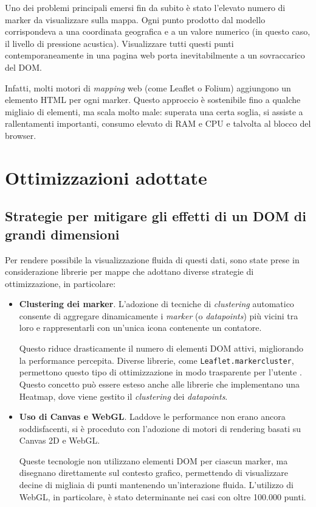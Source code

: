 Uno dei problemi principali emersi fin da subito è stato l'elevato numero di marker da visualizzare sulla mappa. Ogni punto prodotto dal modello corrispondeva a una coordinata geografica e a un valore numerico (in questo caso, il livello di pressione acustica). Visualizzare tutti questi punti contemporaneamente in una pagina web porta inevitabilmente a un sovraccarico del DOM.

Infatti, molti motori di \textit{mapping} web (come Leaflet o Folium) aggiungono un elemento HTML per ogni marker. Questo approccio è sostenibile fino a qualche migliaio di elementi, ma scala molto male: superata una certa soglia, si assiste a rallentamenti importanti, consumo elevato di RAM e CPU e talvolta al blocco del browser. \cite{folium-react}


\section{Ottimizzazioni adottate}

\subsection{Strategie per mitigare gli effetti di un DOM di grandi dimensioni}

Per rendere possibile la visualizzazione fluida di questi dati, sono state prese in considerazione librerie per mappe che adottano diverse strategie di ottimizzazione, in particolare:

\begin{itemize}
  \item \textbf{Clustering dei marker}. L'adozione di tecniche di \textit{clustering} automatico consente di aggregare dinamicamente i \textit{marker} (o \textit{datapoints}) più vicini tra loro e rappresentarli con un'unica icona contenente un contatore. 
  
  Questo riduce drasticamente il numero di elementi DOM attivi, migliorando la performance percepita. Diverse librerie, come \texttt{Leaflet.markercluster}, permettono questo tipo di ottimizzazione in modo trasparente per l'utente \cite{leaflet-clustering}. Questo concetto può essere esteso anche alle librerie che implementano una Heatmap, dove viene gestito il \textit{clustering} dei \textit{datapoints}.

  \item \textbf{Uso di Canvas e WebGL}. Laddove le performance non erano ancora soddisfacenti, si è proceduto con l'adozione di motori di rendering basati su Canvas 2D e WebGL. 
  
  Queste tecnologie non utilizzano elementi DOM per ciascun marker, ma disegnano direttamente sul contesto grafico, permettendo di visualizzare decine di migliaia di punti mantenendo un'interazione fluida. L'utilizzo di WebGL, in particolare, è stato determinante nei casi con oltre 100.000 punti. \cite{deckgl-webgl}
\end{itemize}